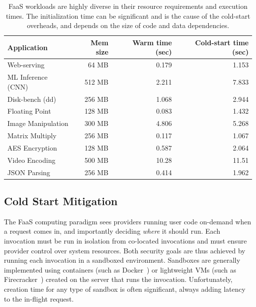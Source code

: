\begin{table}
  \centering
  \caption{FaaS workloads are highly diverse in their resource requirements and execution times. The initialization time can be significant and is the cause of the cold-start overheads, and depends on the size of code and data dependencies.}
  \begin{tabular}{lrrr}
    \hline 
    Application & Mem size & Warm time (sec) & Cold-start time (sec) \\
    \hline
    Web-serving & 64 MB & 0.179 & 1.153 \\  
    ML Inference (CNN) & 512 MB & 2.211 & 7.833 \\
    Disk-bench (dd) & 256 MB & 1.068 & 2.944 \\  
    Floating Point & 128 MB & 0.083 & 1.432 \\  
    Image Manipulation & 300 MB & 4.806 & 5.268 \\  
    Matrix Multiply & 256 MB & 0.117 & 1.067 \\  
    AES Encryption & 128 MB & 0.587 & 2.064 \\  
    Video Encoding & 500 MB & 10.28 & 11.51 \\  
    JSON Parsing & 256 MB & 0.414 & 1.962 \\
    \hline
  \end{tabular}
  \label{tab:workloads}
\end{table}

\subsection{Cold Start Mitigation}
The FaaS computing paradigm sees providers running user code on-demand when a request comes in, and importantly deciding \emph{where} it should run. 
Each invocation must be run in isolation from co-located invocations and must ensure provider control over system resources.
Both security goals are thus achieved by running each invocation in a sandboxed environment. 
Sandboxes are generally implemented using containers (such as Docker~\cite{docker-main}) or lightweight VMs (such as Firecracker~\cite{firecracker-nsdi20}) created on the server that runs the invocation.
Unfortunately, creation time for any type of sandbox is often significant, always adding latency to the in-flight request. 

